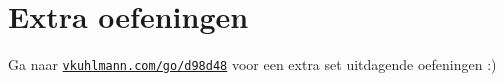 \documentclass[a4paper]{article}
\begin{document}
\section{Extra oefeningen} %

Ga naar \href{https://vkuhlmann.com/go/d98d48}{\nolinkurl{vkuhlmann.com/go/d98d48}}
voor een extra set uitdagende oefeningen :)











\end{document}
